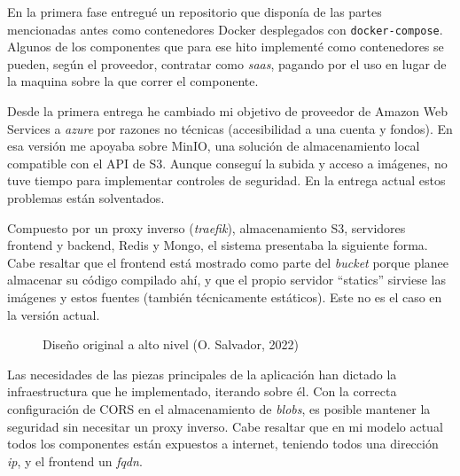 \documentclass[11pt]{article}
\begin{document}
\begin{flushleft}
\smallskip

En la primera fase entregué un repositorio que disponía de las partes mencionadas antes como contenedores Docker desplegados con \texttt{docker-compose}. Algunos de los componentes que para ese hito implementé como contenedores se pueden, según el proveedor, contratar como \textit{\acrlong{saas}}, pagando por el uso en lugar de la maquina sobre la que correr el componente.  
\linebreak

Desde la primera entrega he cambiado mi objetivo de proveedor de Amazon Web Services a \textit{\gls{azure}} por razones no técnicas (accesibilidad a una cuenta y fondos). En esa versión me apoyaba sobre MinIO, una solución de almacenamiento local compatible con el API de S3. Aunque conseguí la subida y acceso a imágenes, no tuve tiempo para implementar controles de seguridad. En la entrega actual estos problemas están solventados.
\linebreak



\clearpage
Compuesto por un proxy inverso (\textit{\gls{traefik}}), almacenamiento S3, servidores frontend y backend, Redis y Mongo, el sistema presentaba la siguiente forma. Cabe resaltar que el frontend está mostrado como parte del \textit{\gls{bucket}} porque planee almacenar su código compilado ahí, y que el propio servidor  ``statics'' sirviese las imágenes y estos fuentes (también técnicamente estáticos). Este no es el caso en la versión actual.

	\begin{figure}[htb]
		\centering
		\caption{Diseño original a alto nivel (O. Salvador, 2022)}
	\end{figure}

Las necesidades de las piezas principales de la aplicación han dictado la infraestructura que he implementado, iterando sobre él. Con la correcta configuración de CORS en el almacenamiento de \textit{\gls{blob}s}, es posible mantener la seguridad sin necesitar un proxy inverso. Cabe resaltar que en mi modelo actual todos los componentes están expuestos a internet, teniendo todos una dirección \textit{\acrshort{ip}}, y el frontend un \textit{\acrshort{fqdn}}.
\linebreak


\end{flushleft}
\end{document}
